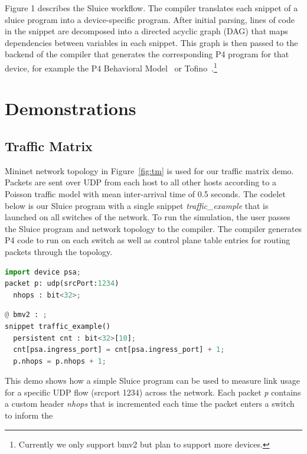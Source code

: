 Figure 1 describes the Sluice workflow. The compiler translates each snippet of
a sluice program into a device-specific program. After initial parsing, lines
of code in the snippet are decomposed into a directed acyclic graph (DAG) that
maps dependencies between variables in each snippet. This graph is then passed
to the backend of the compiler that generates the corresponding P4 program for
that device, for example the P4 Behavioral Model~\cite{bmv2} or Tofino~\cite{tofino}.\footnote{Currently we only support
bmv2 but plan to support more devices.} 
\vspace{-0.05in}
\section{Demonstrations}
\vspace{-0.05in}
\subsection{Traffic Matrix}
\vspace{-0.03in}
Mininet network topology in Figure~\ref{fig:tm} is used for our traffic matrix demo.
Packets are sent over UDP from each host to all other hosts according to a
Poisson traffic model with mean inter-arrival time of 0.5 seconds. The codelet
below is our Sluice program with a single snippet \textit{traffic\_example}
that is launched on all switches of the network. To run the simulation, the
user passes the Sluice program and network topology to the compiler. The
compiler generates P4 code to run on each switch as well as control plane table entries for routing packets through the topology.
\vspace{-0.05in}
\begin{lstlisting}[language=Python, basicstyle=\scriptsize]
import device psa;
packet p: udp(srcPort:1234)
  nhops : bit<32>;
\end{lstlisting}
\vspace{-0.05in}
\begin{lstlisting}[language=Python, basicstyle=\scriptsize]
@ bmv2 : ;
snippet traffic_example()
  persistent cnt : bit<32>[10];
  cnt[psa.ingress_port] = cnt[psa.ingress_port] + 1;
  p.nhops = p.nhops + 1;
\end{lstlisting}
\vspace{-0.05in}
This demo shows how a simple Sluice program can be used to measure link usage for a specific UDP flow (srcport 1234) across the network. Each packet \textit{p} contains a custom header \textit{nhops}
that is incremented each time the packet enters a switch to inform the
